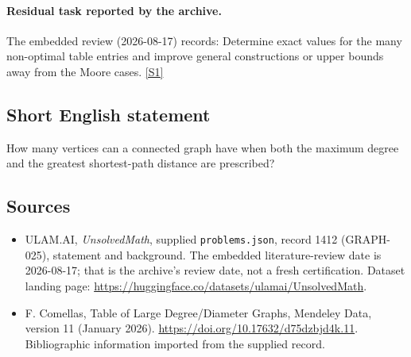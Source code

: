\documentclass[11pt,a4paper]{article}
\newcommand{\sref}[2]{\hyperlink{source:#1:#2}{[S#2]}}
\begin{document}
\paragraph{Residual task reported by the archive.}

The embedded review (2026-08-17) records: Determine exact values for the many non-optimal table entries and improve general constructions or upper bounds away from the Moore cases. \sref{1412}{1}

\subsection{Short English statement}

How many vertices can a connected graph have when both the maximum degree and the greatest shortest-path distance are prescribed?

\subsection{Sources}

{\small

\begin{itemize}

\item[\hypertarget{source:1412:1}{S1}] ULAM.AI, \emph{UnsolvedMath}, supplied \texttt{problems.json}, record 1412 (GRAPH-025), statement and background. The embedded literature-review date is 2026-08-17; that is the archive’s review date, not a fresh certification. Dataset landing page: \url{https://huggingface.co/datasets/ulamai/UnsolvedMath}.

\item[\hypertarget{source:1412:2}{S2}] F. Comellas, Table of Large Degree/Diameter Graphs, Mendeley Data, version 11 (January 2026). \url{https://doi.org/10.17632/d75dzbjd4k.11}. Bibliographic information imported from the supplied record.

\end{itemize}

}

\label{end:1412}
\end{document}
